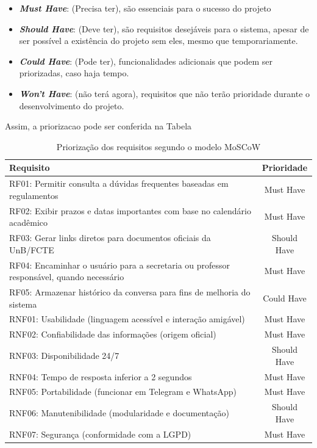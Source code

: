         \begin{itemize}
            \item \textbf{\textit{Must Have}}: (Precisa
            ter), são essenciais para o sucesso do projeto
            \item \textbf{\textit{Should Have}}: (Deve ter), são requisitos desejáveis para o sistema, apesar de ser possível a existência do projeto sem eles, mesmo que temporariamente.
            \item \textbf{\textit{Could Have}}: (Pode ter), funcionalidades adicionais que podem ser priorizadas, caso haja tempo.
            \item \textbf{\textit{Won’t Have}}: (não terá agora), requisitos que não terão prioridade durante o desenvolvimento do projeto.
        \end{itemize}

Assim, a priorizacao pode ser conferida na Tabela ~\cite{priorizacao_requisitos}

\begin{table}[H]
\caption{Priorização dos requisitos segundo o modelo MoSCoW}
\label{tab:priorizacao_requisitos}
\centering
\begin{tabular}{|p{9cm}|c|}
\hline
\textbf{Requisito} & \textbf{Prioridade} \\
\hline
RF01: Permitir consulta a dúvidas frequentes baseadas em regulamentos & Must Have \\
\hline
RF02: Exibir prazos e datas importantes com base no calendário acadêmico & Must Have \\
\hline
RF03: Gerar links diretos para documentos oficiais da UnB/FCTE & Should Have \\
\hline
RF04: Encaminhar o usuário para a secretaria ou professor responsável, quando necessário & Must Have \\
\hline
RF05: Armazenar histórico da conversa para fins de melhoria do sistema & Could Have \\
\hline
RNF01: Usabilidade (linguagem acessível e interação amigável) & Must Have \\
\hline
RNF02: Confiabilidade das informações (origem oficial) & Must Have \\
\hline
RNF03: Disponibilidade 24/7 & Should Have \\
\hline
RNF04: Tempo de resposta inferior a 2 segundos & Must Have \\
\hline
RNF05: Portabilidade (funcionar em Telegram e WhatsApp) & Must Have \\
\hline
RNF06: Manutenibilidade (modularidade e documentação) & Should Have \\
\hline
RNF07: Segurança (conformidade com a LGPD) & Must Have \\
\hline
\end{tabular}
\end{table}

